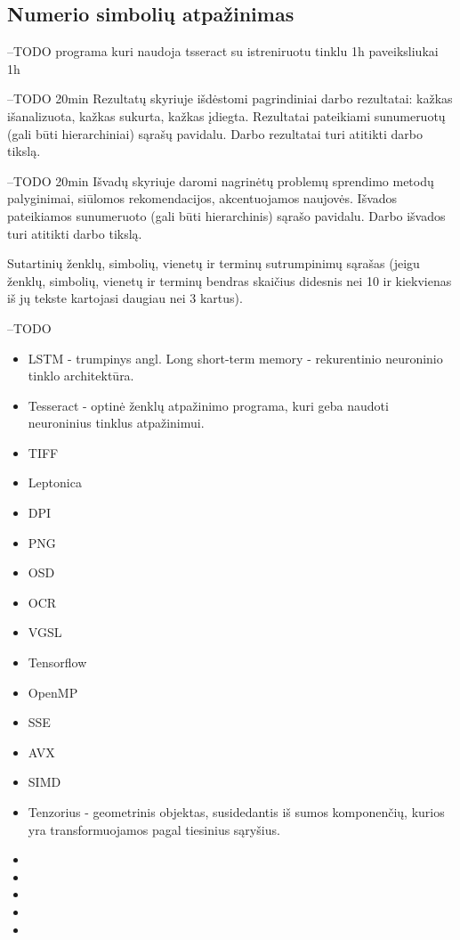 \documentclass{VUMIFInfBakalaurinis}
\begin{document}
\subsection{Numerio simbolių atpažinimas}
--TODO
programa kuri naudoja tsseract su istreniruotu tinklu 1h
paveiksliukai 1h


\pagebreak
{}
--TODO 20min
Rezultatų skyriuje išdėstomi pagrindiniai darbo rezultatai: kažkas išanalizuota, kažkas
sukurta, kažkas įdiegta. Rezultatai pateikiami sunumeruotų (gali būti hierarchiniai) sąrašų pavidalu.
Darbo rezultatai turi atitikti darbo tikslą.

--TODO 20min
Išvadų skyriuje daromi nagrinėtų problemų sprendimo metodų palyginimai, siūlomos
rekomendacijos, akcentuojamos naujovės. Išvados pateikiamos sunumeruoto (gali būti
hierarchinis) sąrašo pavidalu. Darbo išvados turi atitikti darbo tikslą. 

\pagebreak
\printbibliography[heading=bibintoc]

\pagebreak
{}
Sutartinių ženklų, simbolių, vienetų ir terminų sutrumpinimų sąrašas (jeigu
ženklų, simbolių, vienetų ir terminų bendras skaičius didesnis nei 10 ir
kiekvienas iš jų tekste kartojasi daugiau nei 3 kartus).

--TODO
\begin{itemize}
  \item LSTM - trumpinys angl. Long short-term memory - rekurentinio neuroninio tinklo architektūra.
  \item Tesseract - optinė ženklų atpažinimo programa, kuri geba naudoti neuroninius tinklus atpažinimui.
  \item TIFF
  \item Leptonica
  \item DPI
  \item PNG
  \item OSD
  \item OCR
  \item VGSL
  \item Tensorflow
  \item OpenMP
  \item SSE
  \item AVX
  \item SIMD
  \item Tenzorius - geometrinis objektas, susidedantis iš sumos komponenčių, kurios yra transformuojamos pagal tiesinius sąryšius.
  \item 
  \item 
  \item 
  \item 
  \item 
\end{itemize}
\end{document}
